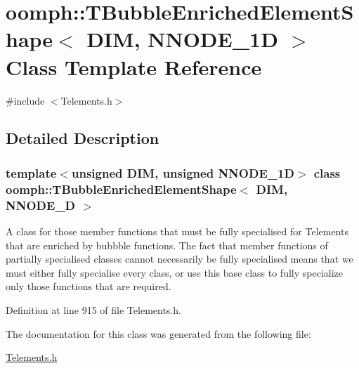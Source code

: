 \hypertarget{classoomph_1_1TBubbleEnrichedElementShape}{}\section{oomph\+:\+:T\+Bubble\+Enriched\+Element\+Shape$<$ D\+IM, N\+N\+O\+D\+E\+\_\+1D $>$ Class Template Reference}
\label{classoomph_1_1TBubbleEnrichedElementShape}


{\ttfamily \#include $<$Telements.\+h$>$}



\subsection{Detailed Description}
\subsubsection*{template$<$unsigned D\+IM, unsigned N\+N\+O\+D\+E\+\_\+1D$>$\newline
class oomph\+::\+T\+Bubble\+Enriched\+Element\+Shape$<$ D\+I\+M, N\+N\+O\+D\+E\+\_\+D $>$}

A class for those member functions that must be fully specialised for Telements that are enriched by bubbble functions. The fact that member functions of partially specialised classes cannot necessarily be fully specialised means that we must either fully specialise every class, or use this base class to fully specialize only those functions that are required. 

Definition at line 915 of file Telements.\+h.



The documentation for this class was generated from the following file\+:\begin{DoxyCompactItemize}
\item 
\hyperlink{Telements_8h}{Telements.\+h}\end{DoxyCompactItemize}
